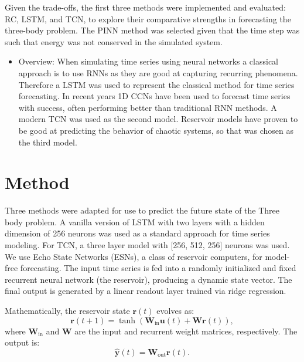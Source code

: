 \documentclass[%
 reprint,
 amsmath,amssymb,
 aps,
]{revtex4-2}
\begin{document}
Given the trade-offs, the first three methods were implemented and evaluated: RC, LSTM, and TCN, to explore their comparative strengths in forecasting the three-body problem. The PINN method was selected given that the time step was such that energy was not conserved in the simulated system. 

\begin{itemize}
    \item Overview:   When simulating time series using neural networks a classical approach is to use RNNs as they are good at capturing recurring phenomena. Therefore a LSTM was used to represent the classical method for time series forecasting. In recent years 1D CCNs have been used to forecast time series with success, often performing better than traditional RNN methods. A modern TCN was used as the second model. Reservoir models have proven to be good at predicting the behavior of chaotic systems, so that was chosen as the third model.
\end{itemize}






\section{\label{sec:method}Method} %

Three methods were adapted for use to predict the future state of the Three body problem. A vanilla version of LSTM with two layers with a hidden dimension of 256 neurons was used as a standard approach for time series modeling. 
For TCN, a three layer model with [256, 512, 256] neurons was used.
We use Echo State Networks (ESNs), a class of reservoir computers, for model-free forecasting. The input time series is fed into a randomly initialized and fixed recurrent neural network (the reservoir), producing a dynamic state vector. The final output is generated by a linear readout layer trained via ridge regression.

Mathematically, the reservoir state $\mathbf{r}(t)$ evolves as:
\begin{equation}
\mathbf{r}(t+1) = \tanh(\mathbf{W}_{\text{in}}\mathbf{u}(t) + \mathbf{W}\mathbf{r}(t)),
\end{equation}
where $\mathbf{W}_{\text{in}}$ and $\mathbf{W}$ are the input and recurrent weight matrices, respectively. The output is:
\begin{equation}
\hat{\mathbf{y}}(t) = \mathbf{W}_{\text{out}}\mathbf{r}(t).
\end{equation}
\end{document}

